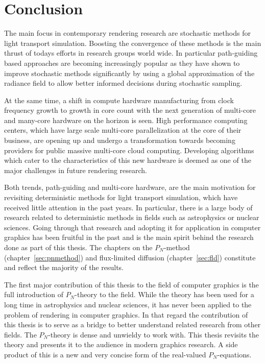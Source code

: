 \chapter{Conclusion}
%
\label{sec:conclusion}

The main focus in contemporary rendering research are stochastic methods for light transport simulation. Boosting the convergence of these methods is the main thrust of todays efforts in research groups world wide. In particular path-guiding based approaches are becoming increasingly popular as they have shown to improve stochastic methods significantly by using a global approximation of the radiance field to allow better informed decisions during stochastic sampling.

At the same time, a shift in compute hardware manufacturing from clock frequency growth to growth in core count with the next generation of multi-core and many-core hardware on the horizon is seen. High performance computing centers, which have large scale multi-core parallelization at the core of their business, are opening up and undergo a transformation towards becoming providers for public massive multi-core cloud computing. Developing algorithms which cater to the characteristics of this new hardware is deemed as one of the major challenges in future rendering research.

Both trends, path-guiding and multi-core hardware, are the main motivation for revisiting deterministic methods for light transport simulation, which have received little attention in the past years. In particular, there is a large body of research related to deterministic methods in fields such as astrophysics or nuclear sciences. Going through that research and adopting it for application in computer graphics has been fruitful in the past and is the main spirit behind the research done as part of this thesis. The chapters on the $P_N$-method (chapter~\ref{sec:pnmethod}) and flux-limited diffusion (chapter~\ref{sec:fld}) constitute and reflect the majority of the results.

The first major contribution of this thesis to the field of computer graphics is the full introduction of $P_N$-theory to the field. While the theory has been used for a long time in astrophysics and nuclear sciences, it has never been applied to the problem of rendering in computer graphics. In that regard the contribution of this thesis is to serve as a bridge to better understand related research from other fields. The $P_N$-theory is dense and unwieldy to work with. This thesis revisits the theory and presents it to the audience in modern graphics research. A side product of this is a new and very concise form of the real-valued $P_N$-equations.

